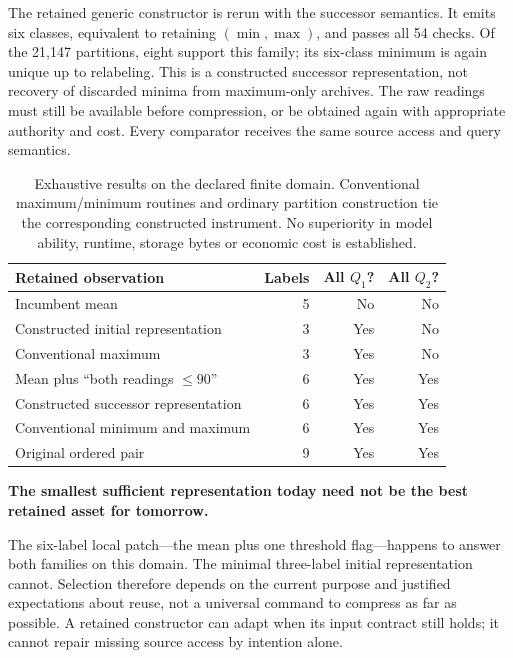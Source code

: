 The retained generic constructor is rerun with the successor semantics. It emits six classes, equivalent to retaining $(\min,\max)$, and passes all 54 checks. Of the 21,147 partitions, eight support this family; its six-class minimum is again unique up to relabeling. This is a constructed successor representation, not recovery of discarded minima from maximum-only archives. The raw readings must still be available before compression, or be obtained again with appropriate authority and cost. Every comparator receives the same source access and query semantics.

\begin{table}[htbp]
\centering\small
\begin{tabularx}{\textwidth}{Yrrr}
\toprule
\textbf{Retained observation} & \textbf{Labels} & \textbf{All $Q_1$?} & \textbf{All $Q_2$?}\\
\midrule
Incumbent mean & 5 & No & No\\
Constructed initial representation & 3 & Yes & No\\
Conventional maximum & 3 & Yes & No\\
Mean plus ``both readings $\leq90$'' & 6 & Yes & Yes\\
Constructed successor representation & 6 & Yes & Yes\\
Conventional minimum and maximum & 6 & Yes & Yes\\
Original ordered pair & 9 & Yes & Yes\\
\bottomrule
\end{tabularx}
\caption{Exhaustive results on the declared finite domain. Conventional maximum/minimum routines and ordinary partition construction tie the corresponding constructed instrument. No superiority in model ability, runtime, storage bytes or economic cost is established.}
\label{tab:construction}
\end{table}

\begin{thesisbox}
\textbf{The smallest sufficient representation today need not be the best retained asset for tomorrow.}
\end{thesisbox}
The six-label local patch---the mean plus one threshold flag---happens to answer both families on this domain. The minimal three-label initial representation cannot. Selection therefore depends on the current purpose and justified expectations about reuse, not a universal command to compress as far as possible. A retained constructor can adapt when its input contract still holds; it cannot repair missing source access by intention alone.

